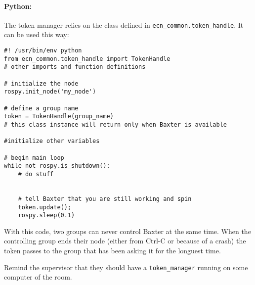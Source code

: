 \documentclass{ecnreport}
\begin{document}
 \paragraph{Python: } The token manager relies on the class defined in \texttt{ecn\_common.token\_handle}. It can be used this way:
\pythonstyle \begin{lstlisting}
#! /usr/bin/env python
from ecn_common.token_handle import TokenHandle
# other imports and function definitions

# initialize the node
rospy.init_node('my_node')

# define a group name
token = TokenHandle(group_name)
# this class instance will return only when Baxter is available

#initialize other variables

# begin main loop
while not rospy.is_shutdown():
    # do stuff
    
    
    # tell Baxter that you are still working and spin
    token.update();
    rospy.sleep(0.1)

\end{lstlisting}
With this code, two groups can never control Baxter at the same time. When the controlling group ends their node (either from Ctrl-C or because of a crash) the token
passes to the group that has been asking it for the longuest time.

Remind the supervisor that they should have a \texttt{token\_manager} running on some computer of the room.
\end{document}
